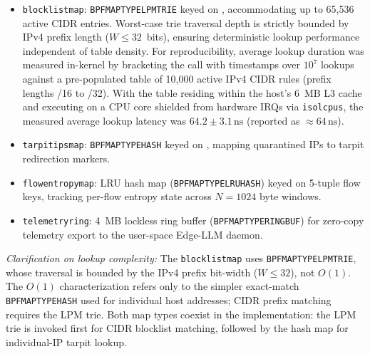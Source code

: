 \documentclass[journal]{IEEEtran}
\renewcommand{\_}{\textunderscore\allowbreak}
\begin{document}
\begin{itemize}
  \item \texttt{blocklist\_map}: \texttt{BPF\_MAP\_TYPE\_}\allowbreak\texttt{LPM\_TRIE} keyed on
    , accommodating up to 65{,}536 active CIDR entries.
    Worst-case trie traversal depth is strictly bounded by IPv4 prefix length ($W \le 32$~bits),
    ensuring deterministic lookup performance independent of table density. For reproducibility,
    average lookup duration was measured in-kernel by bracketing the 
    call with  timestamps over $10^7$ lookups against a
    pre-populated table of 10{,}000 active IPv4 CIDR rules (prefix lengths /16 to /32).
    With the table residing within the host's 6~MB L3 cache and executing on a CPU core
    shielded from hardware IRQs via \texttt{isolcpus}, the measured average lookup
    latency was $64.2 \pm 3.1\,\text{ns}$ (reported as ${\approx}64\,\text{ns}$).

  \item \texttt{tarpit\_ips\_map}: \texttt{BPF\_MAP\_TYPE\_HASH} keyed on
    , mapping quarantined IPs to tarpit redirection markers.

  \item \texttt{flow\_entropy\_map}: LRU hash map
    (\texttt{BPF\_MAP\_TYPE\_}\allowbreak\texttt{LRU\_HASH}) keyed on 5-tuple flow keys, tracking
    per-flow entropy state across $N = 1024$ byte windows.

  \item \texttt{telemetry\_ring}: 4~MB lockless ring buffer
    (\texttt{BPF\_MAP\_TYPE\_}\allowbreak\texttt{RINGBUF}) for zero-copy telemetry export to the
    user-space Edge-LLM daemon.
\end{itemize}

\textit{Clarification on lookup complexity:} The \texttt{blocklist\_map} uses
\texttt{BPF\_MAP\_TYPE\_LPM\_TRIE}, whose traversal is bounded by the IPv4 prefix bit-width
($W \le 32$), not $O(1)$. The $O(1)$ characterization refers only to the
simpler exact-match \texttt{BPF\_MAP\_TYPE\_HASH} used for individual host
addresses; CIDR prefix matching requires the LPM trie. Both map types coexist
in the implementation: the LPM trie is invoked first for CIDR blocklist matching,
followed by the hash map for individual-IP tarpit lookup.
\end{document}
